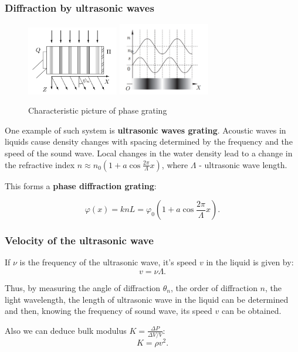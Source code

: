\documentclass{beamer}
\begin{document}
	\begin{frame}
		\frametitle{Diffraction by ultrasonic waves}
		
 		\begin{figure}
			\centering
			\includegraphics[width=4cm]{res/acoustic_grating.png}
			\includegraphics[width=4cm]{res/n_x.png}
			\vspace{-10pt}
			\caption{Characteristic picture of phase grating}
		\end{figure}
		One example of such system is \textbf{ultrasonic waves grating}. 
		Acoustic waves in liquids cause density changes with spacing determined by the
		frequency and the speed of the sound wave.
		Local changes in the water density lead to a change in the refractive index $n \approx n_0 (1 + a\cos{\frac{2\pi}{\Lambda}x})$, where $\Lambda$ - ultrasonic wave length.
	
		This forms a \textbf{phase diffraction grating}:
		
		\vspace{-8pt}
		\begin{equation}
			\varphi(x) = knL = \varphi_0 (1 + a \cos{\frac{2\pi}{\Lambda}x}).
			\label{eq:diffraction}
		\end{equation}
	\end{frame}

	
	\begin{frame}
		\frametitle{Velocity of the ultrasonic wave}
		
		If $\nu$ is the frequency of the ultrasonic wave, it's speed $v$ in the
		liquid is given by:
		\begin{equation}
			v = \nu \Lambda.
			\label{eq:vel}
		\end{equation}
		
		Thus, by measuring the angle of diffraction $\theta_n$, the order of diffraction $n$, the
		light wavelength, the length of ultrasonic wave in the liquid can be determined
		and then, knowing the frequency of sound wave, its speed $v$ can be obtained.
		
		Also we can deduce bulk modulus $K = \frac{\Delta P}{\Delta V / V}$:
		\begin{equation}
			K = \rho v^2.
			\label{eq:k}
		\end{equation}
	\end{frame}
\end{document}
